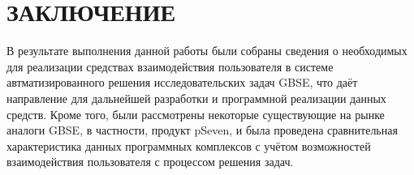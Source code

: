 \chapter*{ЗАКЛЮЧЕНИЕ}\label{chap_conclusion}

В результате выполнения данной работы были собраны сведения о необходимых для реализации средствах взаимодействия пользователя в системе автматизированного решения исследовательских задач GBSE, что даёт направление для дальнейшей разработки и программной реализации данных средств. Кроме того, были рассмотрены некоторые существующие на рынке аналоги GBSE, в частности, продукт pSeven, и была проведена сравнительная характеристика данных программных комплексов с учётом возможностей взаимодействия пользователя с процессом решения задач.

